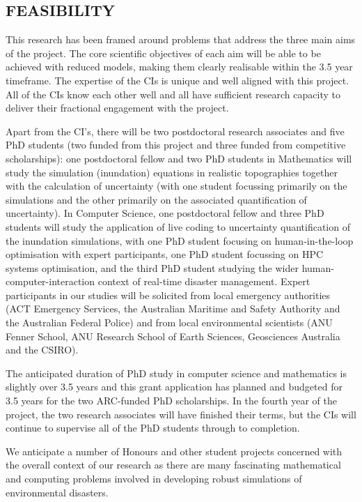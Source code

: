 
\subsection*{FEASIBILITY}



This research has been framed around problems that address the three main aims of the project. The core scientific objectives of each aim will be able to be achieved with reduced models, making them clearly realisable within the 3.5 year timeframe.
The expertise of the CIs is unique and well aligned with this project. All of the CIs know each other well and all have sufficient research capacity to deliver their fractional engagement with the project.

Apart from the CI's, there will be two postdoctoral research associates and five PhD students (two funded from this project and three funded from competitive scholarships): 
one postdoctoral fellow and two PhD students in 
Mathematics will study the simulation (inundation) equations in realistic topographies together with the calculation of uncertainty (with one student focussing primarily on the simulations and the other primarily on the associated quantification of uncertainty). 
In Computer Science, one postdoctoral fellow and three PhD students will study the application of live coding to uncertainty quantification of the inundation simulations, with one PhD student focusing on human-in-the-loop optimisation with expert participants, one PhD student focussing on HPC systems optimisation, 
and the third PhD student studying the wider human-computer-interaction context of real-time disaster management.
Expert participants in our studies will be solicited from local emergency authorities (ACT Emergency
Services, the Australian Maritime and Safety Authority and the Australian Federal Police) and from local environmental scientists (ANU Fenner School, ANU Research School of Earth Sciences, Geosciences Australia and the CSIRO).

The anticipated duration of PhD study in computer science and mathematics is slightly over 3.5 years and this grant application has planned and budgeted for 3.5 years for the two ARC-funded PhD scholarships. In the fourth year of the project, the two research associates will have finished their terms, but the CIs will continue to supervise all of the PhD students through to completion.  

We anticipate a number of Honours and other student projects concerned with the overall context of our research as there are many 
fascinating mathematical and computing problems involved in developing robust simulations of environmental disasters.\\

